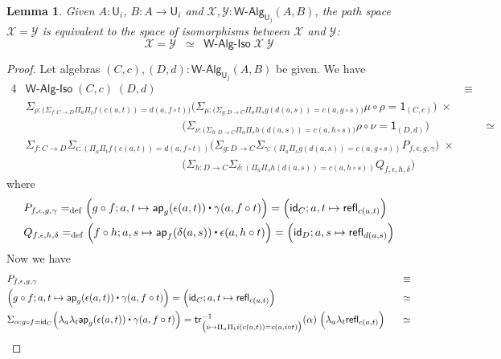 \documentclass[reqno,10pt,a4paper,oneside]{amsart}
\newcommand{\X}{\mathcal{X}}
\newcommand{\Y}{\mathcal{Y}}
\newcommand{\comp}{\circ}
\newcommand{\idfun}[1]{\mathsf{id}_{#1}}
\newcommand{\prd}[1]{\Pi_{#1}}
\newcommand{\sm}[1]{\Sigma_{#1}}
\newcommand{\lam}[1]{\lambda_{#1}}
\newcommand{\defeq}{=_{\mathrm{def}}}
\newcommand{\refl}{\mathsf{refl}}
\newcommand{\one}{\mathsf{1}}
\newcommand{\UU}{\mathsf{U}}
\newcommand{\WAlg}{\mathsf{W}\text{-}\mathsf{Alg}}
\newcommand{\app}{\mathsf{ap}}
\newcommand{\trans}{\mathsf{tr}}
\newcommand{\WAlgIso}{\mathsf{W}\text{-}\mathsf{Alg}\text{-}\mathsf{Iso}}
\newcommand{\ct}{%
  \mathchoice{\mathbin{\raisebox{0.5ex}{$\displaystyle\centerdot$}}}%
             {\mathbin{\raisebox{0.5ex}{$\centerdot$}}}%
             {\mathbin{\raisebox{0.25ex}{$\scriptstyle\,\centerdot\,$}}}%
             {\mathbin{\raisebox{0.1ex}{$\scriptscriptstyle\,\centerdot\,$}}}}
\numberwithin{equation}{section}
\theoremstyle{mythm}
\newtheorem{lemma}[theorem]{Lemma}
\theoremstyle{mydef}
\theoremstyle{myrmk}
\begin{document}
\begin{lemma}\label{WAlgSpace}
Given $A:\UU_i$, $B : A \to \UU_i$ and $\X,\Y : \WAlg_{\UU_j}(A,B)$, the path space $\X = \Y$ is equivalent to the space of isomorphisms between $\X$ and $\Y$:
\[ \X = \Y \;\; \simeq \;\; \WAlgIso \; \X \; \Y \] 
\end{lemma}
\begin{proof}
Let algebras $(C,c), (D,d) : \WAlg_{\UU_j}(A,B)$ be given. We have
\begin{alignat*}{4}
& \WAlgIso \; (C,c) \; (D,d) & \equiv \\
& \sm{\rho : \big(\sm{f:C\to D} \prd{a}\prd{t} f(c(a,t)) = d(a,f \comp t) \big)} \Big(\sm{\mu : \big(\sm{g:D\to C} \prd{a}\prd{s} g(d(a,s)) = c(a,g \comp s)\big)} \mu \comp \rho = \one_{(C,c)} \Big)\; \times & \\
& \;\;\;\;\;\;\;\;\;\;\;\;\;\;\;\;\;\;\;\;\;\;\;\;\;\;\;\;\;\;\;\;\;\;\;\;\;\;\;\;\;\;\;\;\;\;\;\;\;\;\Big(\sm{\nu : \big(\sm{h:D\to C} \prd{a}\prd{s} h(d(a,s))=c(a,h\comp s)\big)} \rho \comp \nu = \one_{(D,d)}\Big) & \;\;\;\;\;\;\; \simeq \\
& \sm{f : C\to D} \sm{\epsilon : (\prd{a}\prd{t} f(c(a,t)) = d(a,f \comp t))} \Big(\sm{g:D\to C} \sm{\gamma : (\prd{a}\prd{s} g(d(a,s)) = c(a,g \comp s))} P_{f,\epsilon,g,\gamma}\Big) \; \times & \\
& \;\;\;\;\;\;\;\;\;\;\;\;\;\;\;\;\;\;\;\;\;\;\;\;\;\;\;\;\;\;\;\;\;\;\;\;\;\;\;\;\;\;\;\;\;\;\;\;\;\; \Big(\sm{h:D\to C} \sm{\delta : (\prd{a}\prd{s} h(d(a,s))=c(a,h\comp s))} Q_{f,\epsilon,h,\delta} \Big) &
\end{alignat*}
where
\begin{align*}
& P_{f,\epsilon,g,\gamma} \defeq \Big(g \comp f; a,t \mapsto \app_g(\epsilon(a,t)) \ct \gamma(a, f \comp t)\Big) = \Big(\idfun{C}; a,t \mapsto \refl_{c(a,t)}\Big) \\
& Q_{f,\epsilon,h,\delta} \defeq \Big(f \comp h; a,s \mapsto \app_f(\delta(a,s)) \ct \epsilon(a, h \comp t)\Big) = \Big(\idfun{D}; a,s \mapsto \refl_{d(a,s)}\Big)
\end{align*}
Now we have
\begin{alignat*}{4}
& P_{f,\epsilon,g,\gamma} & \equiv \\
& \Big(g \comp f; a,t \mapsto \app_g(\epsilon(a,t)) \ct \gamma(a, f \comp t)\Big) = \Big(\idfun{C}; a,t \mapsto \refl_{c(a,t)}\Big) & \simeq \\
& \sm{\alpha : g \comp f = \idfun{C}} \Big(\lam{a}\lam{t} \app_g(\epsilon(a,t)) \ct \gamma(a, f \comp t)\Big) = \trans^{-1}_{\big(i \mapsto \prd{a}\prd{t} i(c(a,t)) = c(a,i \comp t)\big)}(\alpha) \; \Big(\lam{a}\lam{t} \refl_{c(a,t)}\Big) & \;\;\; \simeq \\

\end{alignat*}
\end{proof}
\end{document}
